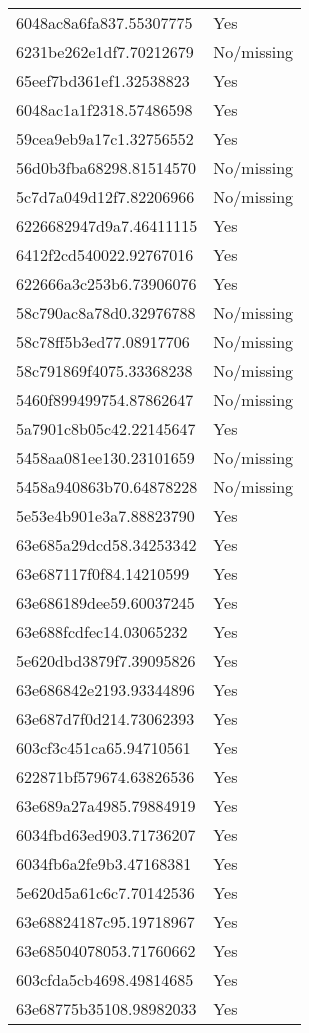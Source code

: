 \begin{tabular}{ll}
6048ac8a6fa837.55307775 & Yes \\
6231be262e1df7.70212679 & No/missing \\
65eef7bd361ef1.32538823 & Yes \\
6048ac1a1f2318.57486598 & Yes \\
59cea9eb9a17c1.32756552 & Yes \\
56d0b3fba68298.81514570 & No/missing \\
5c7d7a049d12f7.82206966 & No/missing \\
6226682947d9a7.46411115 & Yes \\
6412f2cd540022.92767016 & Yes \\
622666a3c253b6.73906076 & Yes \\
58c790ac8a78d0.32976788 & No/missing \\
58c78ff5b3ed77.08917706 & No/missing \\
58c791869f4075.33368238 & No/missing \\
5460f899499754.87862647 & No/missing \\
5a7901c8b05c42.22145647 & Yes \\
5458aa081ee130.23101659 & No/missing \\
5458a940863b70.64878228 & No/missing \\
5e53e4b901e3a7.88823790 & Yes \\
63e685a29dcd58.34253342 & Yes \\
63e687117f0f84.14210599 & Yes \\
63e686189dee59.60037245 & Yes \\
63e688fcdfec14.03065232 & Yes \\
5e620dbd3879f7.39095826 & Yes \\
63e686842e2193.93344896 & Yes \\
63e687d7f0d214.73062393 & Yes \\
603cf3c451ca65.94710561 & Yes \\
622871bf579674.63826536 & Yes \\
63e689a27a4985.79884919 & Yes \\
6034fbd63ed903.71736207 & Yes \\
6034fb6a2fe9b3.47168381 & Yes \\
5e620d5a61c6c7.70142536 & Yes \\
63e68824187c95.19718967 & Yes \\
63e68504078053.71760662 & Yes \\
603cfda5cb4698.49814685 & Yes \\
63e68775b35108.98982033 & Yes \\

\end{tabular}

